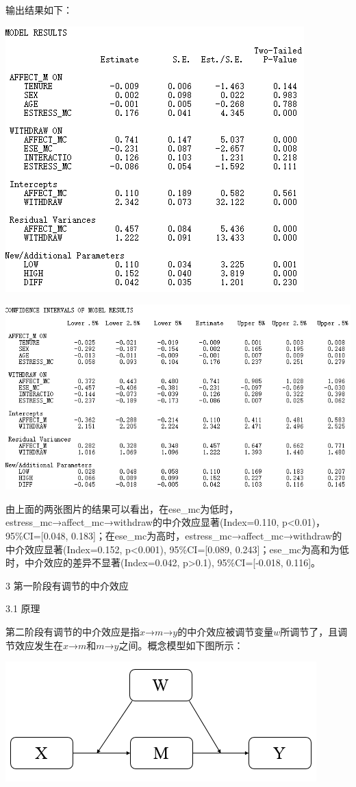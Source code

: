 \documentclass[
]{book}
\begin{document}
输出结果如下：

\includegraphics{figs/1147.png}

\includegraphics{figs/1148.png}

由上面的两张图片的结果可以看出，在ese\_mc为低时，estress\_mc→affect\_mc→withdraw的中介效应显著(Index=0.110, p\textless0.01)，95\%CI={[}0.048, 0.183{]}；在ese\_mc为高时，estress\_mc→affect\_mc→withdraw的中介效应显著(Index=0.152, p\textless0.001), 95\%CI={[}0.089, 0.243{]}；ese\_mc为高和为低时，中介效应的差异不显著(Index=0.042, p\textgreater0.1), 95\%CI={[}-0.018, 0.116{]}。

3 第一阶段有调节的中介效应

3.1 原理

第二阶段有调节的中介效应是指\(x\)→\(m\)→\(y\)的中介效应被调节变量\(w\)所调节了，且调节效应发生在\(x\)→\(m\)和\(m\)→\(y\)之间。概念模型如下图所示：

\includegraphics{figs/1149.png}
\end{document}

